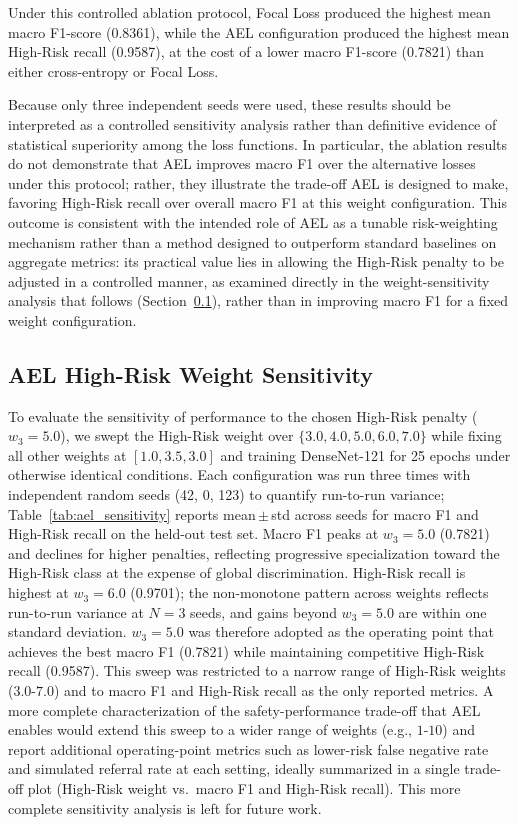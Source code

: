\documentclass[11pt,a4paper]{article}
\begin{document}
Under this controlled ablation protocol, Focal Loss produced the highest mean
macro F1-score (0.8361), while the AEL configuration produced the highest
mean High-Risk recall (0.9587), at the cost of a lower macro F1-score
(0.7821) than either cross-entropy or Focal Loss.

Because only three independent seeds were used, these results should be
interpreted as a controlled sensitivity analysis rather than definitive
evidence of statistical superiority among the loss functions. In particular,
the ablation results do not demonstrate that AEL improves macro F1 over the
alternative losses under this protocol; rather, they illustrate the
trade-off AEL is designed to make, favoring High-Risk recall over overall
macro F1 at this weight configuration. This
outcome is consistent with the intended role of AEL as a tunable
risk-weighting mechanism rather than a method designed to outperform
standard baselines on aggregate metrics: its practical value lies in
allowing the High-Risk penalty to be adjusted in a controlled manner,
as examined directly in the weight-sensitivity analysis
that follows (Section~\ref{sec:ael_sensitivity}), rather than in improving
macro F1 for a fixed weight configuration.

\subsection{AEL High-Risk Weight Sensitivity}
\label{sec:ael_sensitivity}

To evaluate the sensitivity of performance to the chosen High-Risk penalty
($w_3 = 5.0$), we swept the High-Risk weight over $\{3.0, 4.0, 5.0, 6.0, 7.0\}$ while
fixing all other weights at $[1.0, 3.5, 3.0]$ and training DenseNet-121 for
25 epochs under otherwise identical conditions. Each configuration was run
three times with independent random seeds (42, 0, 123) to quantify
run-to-run variance; Table~\ref{tab:ael_sensitivity} reports mean\,$\pm$\,std
across seeds for macro F1 and High-Risk recall on the held-out test set.
Macro F1 peaks at $w_3 = 5.0$ (0.7821) and declines for higher penalties,
reflecting progressive specialization toward the High-Risk class at the
expense of global discrimination. High-Risk recall is highest at $w_3 = 6.0$
(0.9701); the non-monotone pattern across weights reflects run-to-run variance
at $N=3$ seeds, and gains beyond $w_3 = 5.0$ are within one standard deviation.
$w_3 = 5.0$ was therefore adopted as the operating point that achieves the
best macro F1 (0.7821) while maintaining competitive High-Risk recall (0.9587).
This sweep was restricted to a narrow range of High-Risk weights ($3.0$-$7.0$)
and to macro F1 and High-Risk recall as the only reported metrics. A more
complete characterization of the safety-performance trade-off that AEL
enables would extend this sweep to a wider range of weights (e.g., $1$-$10$)
and report additional operating-point metrics such as lower-risk false
negative rate and simulated referral rate at each setting, ideally
summarized in a single trade-off plot (High-Risk weight vs.\ macro F1 and
High-Risk recall). This more complete sensitivity analysis is left for
future work.
\end{document}
